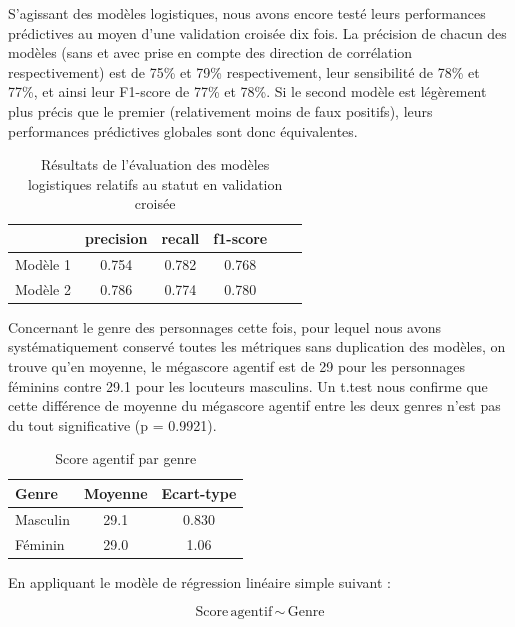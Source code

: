 S’agissant des modèles logistiques, nous avons encore testé leurs performances prédictives au moyen d’une validation croisée dix fois. La précision de chacun des modèles (sans et avec prise en compte des direction de corrélation respectivement) est de 75\% et 79\% respectivement, leur sensibilité de 78\% et 77\%, et ainsi leur F1-score de 77\% et 78\%. Si le second modèle est légèrement plus précis que le premier (relativement moins de faux positifs), leurs performances prédictives globales sont donc équivalentes.

\begin{table}[ht]
  	\caption{Résultats de l'évaluation des modèles logistiques relatifs au statut en validation croisée}
		\centering %
		\begin{tabular}{l c c c c c}
			\toprule
    			 & precision & recall & f1-score \\
			\toprule
			Modèle 1 & 0.754 & 0.782 & 0.768 \\
			\midrule
			Modèle 2 & 0.786 & 0.774 & 0.780 \\
			\bottomrule
		\end{tabular}
            \label{Tab:logit_statut}
	\end{table} 

Concernant le genre des personnages cette fois, pour lequel nous avons systématiquement conservé toutes les métriques sans duplication des modèles, on trouve qu’en moyenne, le mégascore agentif est de 29 pour les personnages féminins contre 29.1 pour les locuteurs masculins. Un t.test nous confirme que cette différence de moyenne du mégascore agentif entre les deux genres n’est pas du tout significative (p = 0.9921). 


\begin{table}[ht]
\caption{Score agentif par genre}
\centering
\bigskip
\begin{tabular}{lS[table-format=2.1]S[table-format=1.3]}
    \hline
    Genre &  Moyenne & Ecart-type \\
    \hline
    Masculin &  29.1 & 0.830 \\
    Féminin &  29.0 & 1.06 \\
    \hline
\end{tabular}
 \label{Tab:moy_genre}
\end{table}
\bigskip

En appliquant le modèle de régression linéaire simple suivant : 

\begin{equation}
\text{Score} \, \text{agentif} \, \sim \, \text{Genre}
\end{equation}

